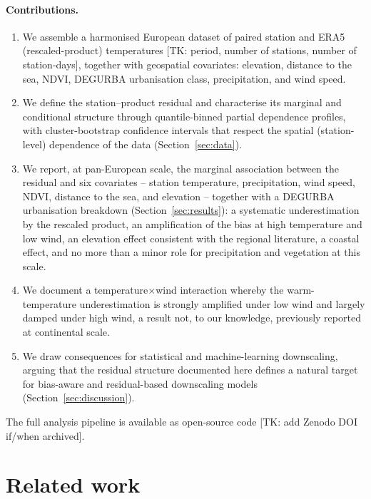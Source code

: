 \documentclass[a4paper,12pt,leqno]{article}
\begin{document}
\paragraph{Contributions.}
\begin{enumerate}
    \item We assemble a harmonised European dataset of paired station and
    ERA5 (rescaled-product) temperatures [TK: period, number of stations,
    number of station-days], together with geospatial covariates:
    elevation, distance to the sea, NDVI, DEGURBA urbanisation class,
    precipitation, and wind speed.
    \item We define the station--product residual and characterise its
    marginal and conditional structure through quantile-binned partial
    dependence profiles, with cluster-bootstrap confidence intervals that
    respect the spatial (station-level) dependence of the data
    (Section~\ref{sec:data}).
    \item We report, at pan-European scale, the marginal association
    between the residual and six covariates -- station temperature,
    precipitation, wind speed, NDVI, distance to the sea, and elevation
    -- together with a DEGURBA urbanisation breakdown
    (Section~\ref{sec:results}): a systematic underestimation by the
    rescaled product, an amplification of the bias at high temperature
    and low wind, an elevation effect consistent with the regional
    literature, a coastal effect, and no more than a minor role for
    precipitation and vegetation at this scale.
    \item We document a temperature$\times$wind interaction whereby the
    warm-temperature underestimation is strongly amplified under low wind
    and largely damped under high wind, a result not, to our knowledge,
    previously reported at continental scale.
    \item We draw consequences for statistical and machine-learning
    downscaling, arguing that the residual structure documented here
    defines a natural target for bias-aware and residual-based
    downscaling models (Section~\ref{sec:discussion}).
\end{enumerate}

The full analysis pipeline is available as open-source code
\cite{souilmi_era5_resid_github} [TK: add Zenodo DOI if/when archived].

\section{Related work}
\label{sec:related}
\end{document}
